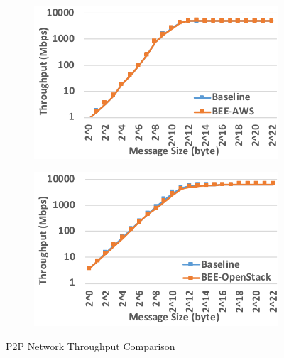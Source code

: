 \begin{figure}[t]
    \begin{subfigure}[t]{0.245\textwidth}
        \includegraphics[width=\textwidth]{figures/band-bee-aws.pdf}
    \end{subfigure}
    \begin{subfigure}[t]{0.245\textwidth}
        \includegraphics[width=\textwidth]{figures/band-bee-os.pdf}
    \end{subfigure}
    \caption{P2P Network Throughput Comparison}
    \label{net-band}
\end{figure}
